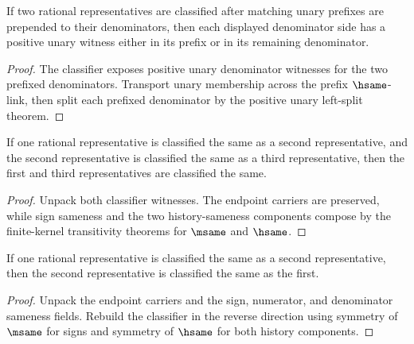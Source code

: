 \begin{theorem}
\label{thm:rat-classifier-spec-append-unary-prefix-denominator-split}
If two rational representatives are classified after matching unary prefixes
are prepended to their denominators, then each displayed denominator side has a
positive unary witness either in its prefix or in its remaining denominator.
\end{theorem}
\begin{proof}
The classifier exposes positive unary denominator witnesses for the two
prefixed denominators. Transport unary membership across the prefix
\(\hsame\)-link, then split each prefixed denominator by the positive unary
left-split theorem.
\end{proof}

\begin{theorem}
\label{thm:rat-classifier-transitivity}
If one rational representative is classified the same as a second representative, and the second representative is classified the same as a third representative, then the first and third representatives are classified the same.
\end{theorem}
\begin{proof}
Unpack both classifier witnesses. The endpoint carriers are preserved, while sign sameness and the two history-sameness components compose by the finite-kernel transitivity theorems for \(\msame\) and \(\hsame\).
\end{proof}

\begin{theorem}
\label{thm:rat-classifier-symmetry}
If one rational representative is classified the same as a second representative,
then the second representative is classified the same as the first.
\end{theorem}
\begin{proof}
Unpack the endpoint carriers and the sign, numerator, and denominator sameness
fields. Rebuild the classifier in the reverse direction using symmetry of
\(\msame\) for signs and symmetry of \(\hsame\) for both history components.
\end{proof}

